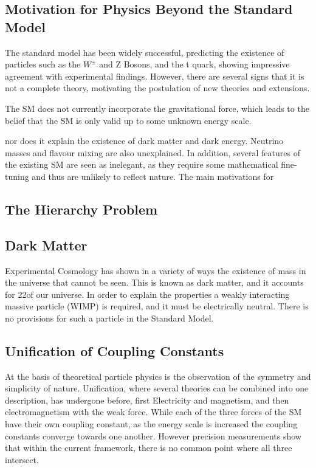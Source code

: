 \begin{description}
\section{Motivation for Physics Beyond the Standard Model}
The standard model has been widely successful, predicting the existence of particles such as the $W^{\pm}$ and Z Bosons, and the t quark, showing impressive agreement with experimental findings. However, there are several signs that it is not a complete theory, motivating the postulation of new theories and extensions. 

The SM does not currently incorporate the gravitational force, which leads to the belief that the SM is only valid up to some unknown energy scale.

 nor does it explain the existence of dark matter and dark energy. Neutrino masses and flavour mixing are also unexplained. In addition, several features of the existing SM are seen as inelegant, as they require some mathematical fine-tuning and thus are unlikely to reflect nature. The main motivations for 
\subsection{The Hierarchy Problem}
\subsection{Dark Matter}

Experimental Cosmology has shown in a variety of ways the existence of mass in the universe that cannot be seen. This is known as dark matter, and it accounts for 22\pc of our universe. In order to explain the properties a weakly interacting massive particle (WIMP) is required, and it must be electrically neutral. There is no provisions for such a particle in the Standard Model. 

\subsection{Unification of Coupling Constants}

At the basis of theoretical particle physics is the observation of the symmetry and simplicity of nature. Unification, where several theories can be combined into one description,  has undergone before, first Electricity and magnetism, and then electromagnetism with the weak force. While each of the three forces of the SM have their own coupling constant, as the energy scale is increased the coupling constants converge towards one another. However precision measurements show that within the current framework,  there is no common point where all three intersect.



\end{description}
